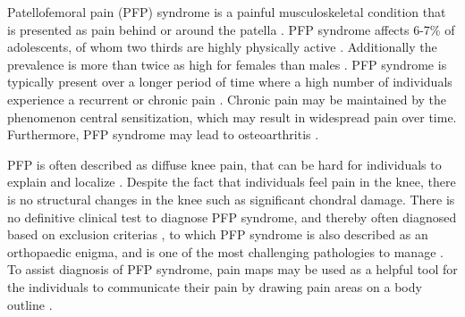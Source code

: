 Patellofemoral pain (PFP) syndrome is a painful musculoskeletal condition that is presented as pain behind or around the patella \citep{Maclachlan2017, Smith2015}. PFP syndrome affects 6-7\% of adolescents, of whom two thirds are highly physically active \citep{Rathleff2015}. Additionally the prevalence is more than twice as high for females than males \citep{Rathleff2015, Petersen2013}.
PFP syndrome is typically present over a longer period of time where a high number of individuals experience a recurrent or chronic pain \citep{Witvrouw2014}. Chronic pain may be maintained by the phenomenon central sensitization, which may result in widespread pain over time. Furthermore, PFP syndrome may lead to osteoarthritis \citep{Petersen2013, Crossley2016}. 

\noindent
PFP is often described as diffuse knee pain, that can be hard for individuals to explain and localize \citep{Witvrouw2014}. Despite the fact that individuals feel pain in the knee, there is no structural changes in the knee such as significant chondral damage. There is no definitive clinical test to diagnose PFP syndrome, and thereby often diagnosed based on exclusion criterias \citep{Petersen2013}, to which PFP syndrome is also described as an orthopaedic enigma, and is one of the most challenging pathologies to manage \citep{Dye2001}.
To assist diagnosis of PFP syndrome, pain maps may be used as a helpful tool for the individuals to communicate their pain by drawing pain areas on a body outline \citep{Boudreau2016}.


